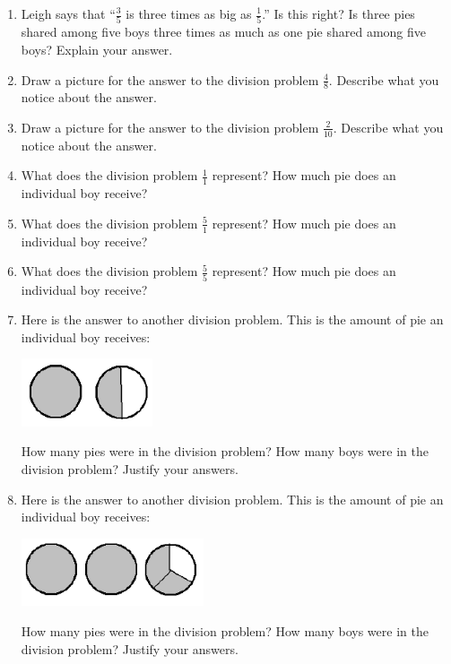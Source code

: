 \begin{enumerate}
\item
Leigh says that ``$\frac 3 5$ is three times as big as $\frac 1 5$.''
Is this right? Is
three pies shared among five boys three times as much as one pie shared among
five boys? Explain your answer.\\

\item
Draw a picture for the answer to the division problem $\frac 4 8$.
Describe
what you notice about the answer.\\

\item
Draw a picture for the answer to the division problem $\frac 2 {10}$.
Describe
what you notice about the answer.\\

\item
What does the division problem $\frac 1 1$
represent? How much pie does an
individual boy receive?\\


\item
What does the division problem $\frac 5 1$
represent? How much pie does
an individual boy receive?\\

\item
What does the division problem $\frac 5 5$
represent? How much pie does
an individual boy receive?\\



\item
Here is the answer to another division problem. This is the amount
of pie an individual boy receives:
\begin{center}
\includegraphics[height = 2cm]{3halfpie}
\end{center}
How many pies were in the division problem?  How many boys were in the division problem?  Justify your answers.\\


\item
Here is the answer to another division problem. This is the amount
of pie an individual boy receives:
\begin{center}
\includegraphics[height = 2cm]{8thirdpie}
\end{center}
How many pies were in the division problem?  How many boys were in the division problem?  Justify your answers.\\




\end{enumerate}
